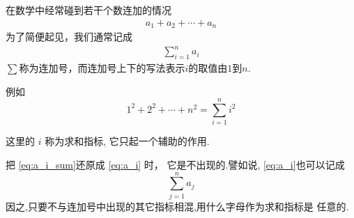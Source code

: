 \documentclass[13pt,fontset=mac]{ctexbeamer}
\begin{document}
\begin{frame}
		\small{
	在数学中经常碰到若干个数连加的情况
	\begin{align}\label{eq:a_i}
		a_1+a_2+\cdots+a_n
	\end{align}
	为了简便起见，我们通常记成
	\begin{align}\label{eq:a_i_sum}
		\sum_{i=1}^{n}a_i
	\end{align}
	$\sum$称为\alert{连加号}，而连加号上下的写法表示$i$的取值由$1$到$n$.
	
	例如
	\[1^2+2^2+\cdots+n^2=\sum_{i=1}^{n}i^2\]
	
	这里的 $i$ 称为\alert{求和指标}, 它只起一个辅助的作用.
	
	把 \eqref{eq:a_i_sum}还原成 \eqref{eq:a_i} 时，
	它是不出现的.譬如说, \eqref{eq:a_i}也可以记成
	$$
	\sum_{j=1}^{n} a_{j}
	$$
因之,只要不与连加号中出现的其它指标相混,用什么字母作为求和指标是
	任意的.}
\end{frame}
\end{document}
